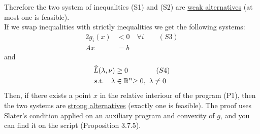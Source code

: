 \documentclass[answers]{exam}
\begin{document}
	Therefore the two system of inequalities (S1) and (S2) are \underline{weak alternatives} (at most one is feasible). \\ 
	If we swap inequalities with strictly inequalities we get the following systems:
	\begin{alignat*}{2}
		g_i(x) &< 0 \quad \forall i\qquad (S3) \\ 
		Ax &= b
	\end{alignat*}
	and 
	\begin{alignat*}{2}
		\widehat{L}(\lambda, \nu) &\geq 0 \qquad \qquad (S4) \\ 
		\text{s.t.}\quad \lambda &\in \mathbb{R}^n{\geq 0},\ \lambda\neq 0
	\end{alignat*}
	Then, if there exists a point $x$ in the relative interiour of the program (P1), then the two systems are \underline{strong alternatives} (exactly one is feasible). The proof uses Slater's condition applied on an auxiliary program and convexity of $g$, and you can find it on the script (Proposition 3.7.5).


    
\end{document}
